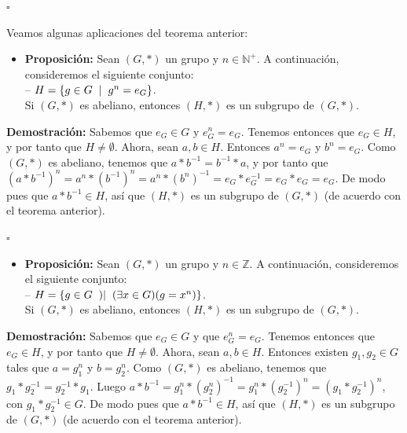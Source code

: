 \documentclass[10 pt]{article}
\begin{document}
\begin{flushright}
    $\square$
\end{flushright}

\Large{Veamos algunas aplicaciones del teorema anterior:} \\

\begin{itemize}
    \item \Large{\textbf{Proposición:} Sean $(G,*)$ un grupo y $n \in \mathbb N^+$. A continuación, consideremos el siguiente conjunto: \\

    -- $H=\{g \in G \hspace{0.2 cm}|\hspace{0.2 cm}g^n=e_G\}$. \\

    Si $(G,*)$ es abeliano, entonces $(H,*)$ es un subgrupo de $(G,*)$.} \\
\end{itemize}

\Large{\textbf{Demostración:} Sabemos que $e_G \in G$ y $e_G^n=e_G$. Tenemos entonces que $e_G \in H$, y por tanto que $H \neq \emptyset$. Ahora, sean $a,b \in H$. Entonces $a^n=e_G$ y $b^n=e_G$. Como $(G,*)$ es abeliano, tenemos que $a*b^{-1}=b^{-1}*a$, y por tanto que $(a * b^{-1})^n=a^n*(b^{-1})^n=a^n * (b^n)^{-1}=e_G*e_G^{-1}=e_G*e_G=e_G$. De modo pues que $a*b^{-1} \in H$, así que $(H,*)$ es un subgrupo de $(G,*)$ (de acuerdo con el teorema anterior).} \\

\begin{flushright}
    $\square$
\end{flushright}

\begin{itemize}
    \item \Large{\textbf{Proposición:} Sean $(G,*)$ un grupo y $n \in \mathbb Z$. A continuación, consideremos el siguiente conjunto: \\

    -- $H=\{g \in G \hspace{0.2 cm})|\hspace{0.2 cm}(\exists x \in G)(g=x^n)\}$. \\

    Si $(G,*)$ es abeliano, entonces $(H,*)$ es un subgrupo de $(G,*)$.} \\
\end{itemize}

\Large{\textbf{Demostración:} Sabemos que $e_G \in G$ y que $e_G^{n}=e_G$. Tenemos entonces que $e_G \in H$, y por tanto que $H \neq \emptyset$. Ahora, sean $a,b \in H$. Entonces existen $g_1,g_2 \in G$ tales que $a=g_1^n$ y $b=g_2^n$. Como $(G,*)$ es abeliano, tenemos que $g_1*g_2^{-1}=g_2^{-1}*g_1$. Luego $a * b^{-1}=g_1^n*(g_2^n)^{-1}=g_1^{n}*(g_2^{-1})^n=(g_1*g_2^{-1})^n$, con $g_1*g_2^{-1} \in G$. De modo pues que $a*b^{-1} \in H$, así que $(H,*)$ es un subgrupo de $(G,*)$ (de acuerdo con el teorema anterior).} \\
\end{document}
